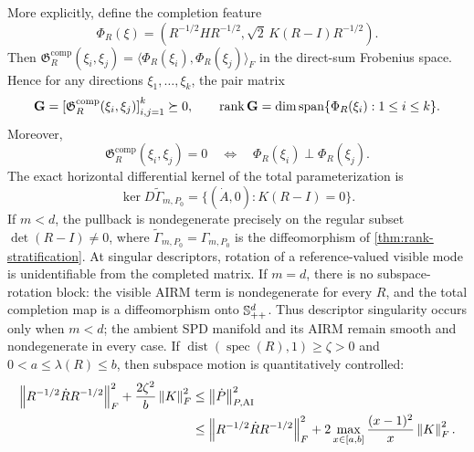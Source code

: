 \begin{theorem}
More explicitly, define the completion feature
\begin{equation}
  \Phi_R(\xi)
  =
  \left(
  R^{-1/2}HR^{-1/2},
  \sqrt{2}\,K(R-I)R^{-1/2}
  \right).
  \label{eq:completion-feature}
\end{equation}
Then
\(
\mathfrak G_R^{\mathrm{comp}}(\xi_i,\xi_j)
=\langle\Phi_R(\xi_i),\Phi_R(\xi_j)\rangle_F
\)
in the direct-sum Frobenius space.  Hence for any directions
\(\xi_1,\ldots,\xi_k\), the pair matrix
\begin{equation}
  \mathbf G
  =\left[\mathfrak G_R^{\mathrm{comp}}(\xi_i,\xi_j)\right]_{i,j=1}^k
  \succeq0,
  \qquad
  \operatorname{rank}\mathbf G
  =\dim\operatorname{span}\{\Phi_R(\xi_i):1\le i\le k\}.
  \label{eq:completion-gram-rank}
\end{equation}
Moreover,
\begin{equation}
  \mathfrak G_R^{\mathrm{comp}}(\xi_i,\xi_j)=0
  \quad\Longleftrightarrow\quad
  \Phi_R(\xi_i)\perp\Phi_R(\xi_j).
  \label{eq:completion-pair-orthogonality}
\end{equation}
The exact horizontal differential kernel of the total parameterization is
\begin{equation}
  \ker D\widetilde\Gamma_{m,P_0}
  =\{(\dot A,0):K(R-I)=0\}.
  \label{eq:stratified-kernel}
\end{equation}
If \(m<d\), the pullback is nondegenerate precisely on the regular subset
\(\det(R-I)\ne0\), where
\(\widetilde\Gamma_{m,P_0}=\Gamma_{m,P_0}\) is the diffeomorphism of
\cref{thm:rank-stratification}.  At singular descriptors, rotation of a
reference-valued visible mode is unidentifiable from the completed matrix.
If \(m=d\), there is no subspace-rotation block: the visible AIRM term is
nondegenerate for every \(R\), and the total completion map is a
diffeomorphism onto \(\mathbb S_{++}^d\).  Thus descriptor singularity occurs only when
\(m<d\); the ambient SPD manifold and its AIRM remain smooth and
nondegenerate in every case.
If
\(\operatorname{dist}(\operatorname{spec}(R),1)\ge\zeta>0\) and
\(0<a\le\lambda(R)\le b\), then subspace motion is quantitatively controlled:
\begin{align}
  \left\lVert R^{-1/2}\dot R R^{-1/2}\right\rVert_F^2
  +\frac{2\zeta^2}{b}\left\lVert K\right\rVert_F^2
  &\le \left\lVert \dot P\right\rVert_{P,\mathrm{AI}}^2
  \nonumber\\
  &\le
  \left\lVert R^{-1/2}\dot R R^{-1/2}\right\rVert_F^2
  +2\max_{x\in[a,b]}\frac{(x-1)^2}{x}\left\lVert K\right\rVert_F^2.
  \label{eq:stratified-conditioning}
\end{align}
\end{theorem}

